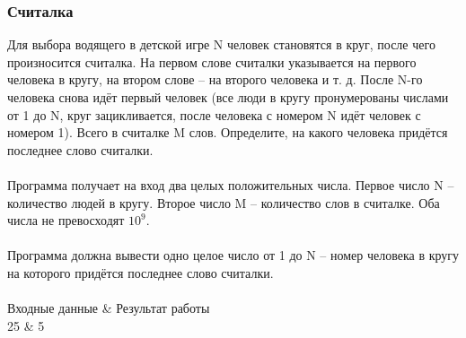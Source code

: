 \documentclass[PDF,10pt,usenames,dvipsnames,t,fragile]{beamer}
\newcommand{\inp}{\vspace{4pt}\\ \vspace{4pt}{\bf Входные данные} \\} %
\newcommand{\out}{\vspace{4pt}\\ \vspace{4pt}{\bf Результат работы} \\} %
\newcommand{\tb}{\\ \hline} %
\newenvironment{ex}{\vspace{4pt}\\ \vspace{4pt}{\bf Пример} \\
\tabularx{\textwidth}{|>{\tt}X|>{\tt}X|}
\hline \sf Входные данные & \sf Результат работы \tb}{\endtabularx}
\begin{document}
\begin{frame}
	\frametitle{Считалка}
	Для выбора водящего в детской игре N человек становятся в круг, после чего
	произносится считалка. На первом слове считалки указывается на первого
	человека в кругу, на втором слове -- на второго человека и т. д. После N-го
	человека снова идёт первый человек (все люди в кругу пронумерованы числами от
	1 до N, круг зацикливается, после человека с номером N идёт человек с номером
	1). Всего в считалке M слов. Определите, на какого человека придётся
	последнее слово считалки.
	\inp 
	Программа получает на вход два целых положительных числа. Первое число N –
	количество людей в кругу. Второе число M -- количество слов в считалке. Оба
	числа не превосходят $10^9$.
	\out
	Программа должна вывести одно целое число от 1 до N -- номер человека в кругу
	на которого придётся последнее слово считалки.
	\begin{ex}
	10 25 & 5 \tb
	\end{ex}
\end{frame}
\end{document}
